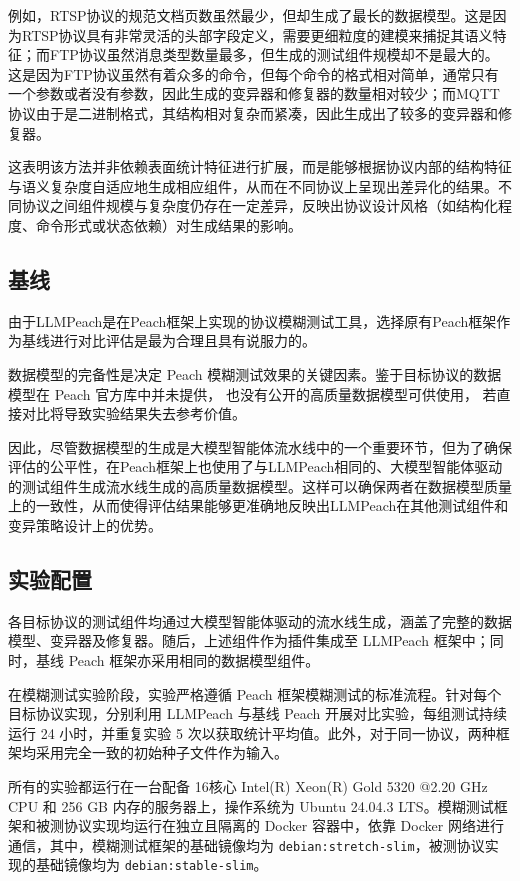 例如，RTSP协议的规范文档页数虽然最少，但却生成了最长的数据模型。这是因为RTSP协议具有非常灵活的头部字段定义，需要更细粒度的建模来捕捉其语义特征；而FTP协议虽然消息类型数量最多，但生成的测试组件规模却不是最大的。这是因为FTP协议虽然有着众多的命令，但每个命令的格式相对简单，通常只有一个参数或者没有参数，因此生成的变异器和修复器的数量相对较少；而MQTT协议由于是二进制格式，其结构相对复杂而紧凑，因此生成出了较多的变异器和修复器。

这表明该方法并非依赖表面统计特征进行扩展，而是能够根据协议内部的结构特征与语义复杂度自适应地生成相应组件，从而在不同协议上呈现出差异化的结果。不同协议之间组件规模与复杂度仍存在一定差异，反映出协议设计风格（如结构化程度、命令形式或状态依赖）对生成结果的影响。

\subsection{基线}

由于LLMPeach是在Peach框架上实现的协议模糊测试工具，选择原有Peach框架作为基线进行对比评估是最为合理且具有说服力的。

数据模型的完备性是决定 Peach 模糊测试效果的关键因素。鉴于目标协议的数据模型在 Peach 官方库中并未提供，
也没有公开的高质量数据模型可供使用，
若直接对比将导致实验结果失去参考价值。

因此，尽管数据模型的生成是大模型智能体流水线中的一个重要环节，但为了确保评估的公平性，在Peach框架上也使用了与LLMPeach相同的、大模型智能体驱动的测试组件生成流水线生成的高质量数据模型。这样可以确保两者在数据模型质量上的一致性，从而使得评估结果能够更准确地反映出LLMPeach在其他测试组件和变异策略设计上的优势。

\subsection{实验配置}

各目标协议的测试组件均通过大模型智能体驱动的流水线生成，涵盖了完整的数据模型、变异器及修复器。随后，上述组件作为插件集成至 LLMPeach 框架中；同时，基线 Peach 框架亦采用相同的数据模型组件。

在模糊测试实验阶段，实验严格遵循 Peach 框架模糊测试的标准流程。针对每个目标协议实现，分别利用 LLMPeach 与基线 Peach 开展对比实验，每组测试持续运行 24 小时，并重复实验 5 次以获取统计平均值。此外，对于同一协议，两种框架均采用完全一致的初始种子文件作为输入。

所有的实验都运行在一台配备 16核心 Intel(R) Xeon(R) Gold 5320 @2.20 GHz CPU 和 256 GB 内存的服务器上，操作系统为 Ubuntu 24.04.3 LTS。模糊测试框架和被测协议实现均运行在独立且隔离的 Docker 容器中，依靠 Docker 网络进行通信，其中，模糊测试框架的基础镜像均为 \texttt{debian:stretch-slim}，被测协议实现的基础镜像均为 \texttt{debian:stable-slim}。

